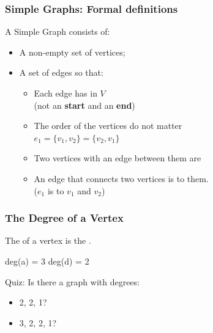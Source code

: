 \documentclass{beamer}
\begin{document}
\begin{frame}
  \frametitle{Simple Graphs: Formal definitions}

  {\larger
    A Simple Graph  consists of:
    \begin{itemize}
    \item A non-empty set  of vertices;
    \item A set  of edges so that:
      \begin{itemize}
      \item Each edge has  in $V$\\
        \hfill (\alert{not an {\bf start} and an {\bf end}})

        \bigskip
      \item The order of the vertices do not matter\\
        \hfill $e_1 = \{v_1,v_2\} = \{v_2, v_1\}$

        \bigskip
      \item Two vertices with an edge between them are

        \bigskip
      \item An edge that connects two vertices is 
        to them.\\
        \hfill ($e_1$ is  to $v_1$ and $v_2$)
      \end{itemize}
    \end{itemize}
  }
\end{frame}

\begin{frame}
  \frametitle{The Degree of a Vertex}

  {\larger

    The  of a vertex is the .

    \begin{center}

      deg(a) = 3 \hspace{1cm} deg(d) = 2
    \end{center}

    \hfill

    \alert{Quiz:} Is there a graph with degrees:
    \begin{itemize}
    \item 2, 2, 1?
    \item 3, 2, 2, 1?
    \end{itemize}
  }
\end{frame}
\end{document}

